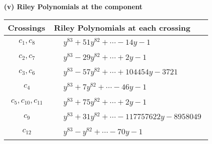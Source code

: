 \documentclass[1p]{elsarticle_modified}
\theoremstyle{definition}
\begin{document}
\newpage\renewcommand{\arraystretch}{1}
\flushleft \textbf{(v) Riley Polynomials at the component}\newline \\
\begin{tabular}{m{50pt}|m{274pt}}
Crossings & \hspace{64pt}Riley Polynomials at each crossing \\
\hline $$\begin{aligned}c_{1},c_{8}\end{aligned}$$&$\begin{aligned}
&y^{83}+51 y^{82}+\cdots-14 y-1
\end{aligned}$\\
\hline $$\begin{aligned}c_{2},c_{7}\end{aligned}$$&$\begin{aligned}
&y^{83}-29 y^{82}+\cdots+2 y-1
\end{aligned}$\\
\hline $$\begin{aligned}c_{3},c_{6}\end{aligned}$$&$\begin{aligned}
&y^{83}-57 y^{82}+\cdots+104454 y-3721
\end{aligned}$\\
\hline $$\begin{aligned}c_{4}\end{aligned}$$&$\begin{aligned}
&y^{83}+7 y^{82}+\cdots-46 y-1
\end{aligned}$\\
\hline $$\begin{aligned}c_{5},c_{10},c_{11}\end{aligned}$$&$\begin{aligned}
&y^{83}+75 y^{82}+\cdots+2 y-1
\end{aligned}$\\
\hline $$\begin{aligned}c_{9}\end{aligned}$$&$\begin{aligned}
&y^{83}+31 y^{82}+\cdots-117757622 y-8958049
\end{aligned}$\\
\hline $$\begin{aligned}c_{12}\end{aligned}$$&$\begin{aligned}
&y^{83}- y^{82}+\cdots-70 y-1
\end{aligned}$\\
\hline
\end{tabular}\\~\\
\end{document}
